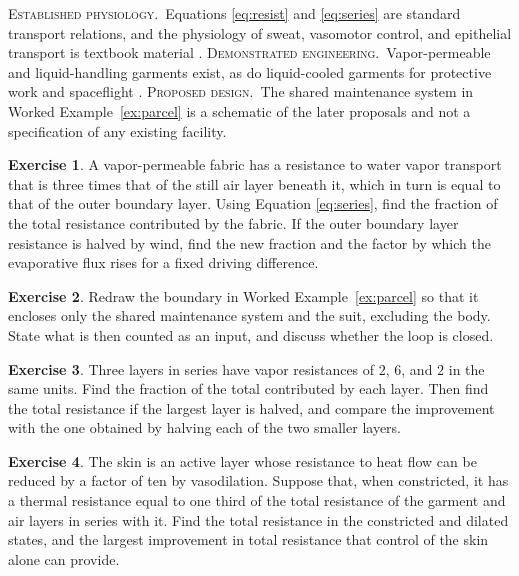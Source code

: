 \documentclass[11pt,openany]{book}
\theoremstyle{definition}
\newtheorem{exercise}{Exercise}[chapter]
\theoremstyle{remark}
\newcommand{\est}{\textsc{Established physiology.}\ }
\newcommand{\dem}{\textsc{Demonstrated engineering.}\ }
\newcommand{\pro}{\textsc{Proposed design.}\ }
\begin{document}
\begin{evidence}
\est Equations \eqref{eq:resist} and \eqref{eq:series} are standard transport relations, and the physiology of sweat, vasomotor control, and epithelial transport is textbook material \cite{bsl2007,guyton2021}. \dem Vapor-permeable and liquid-handling garments exist, as do liquid-cooled garments for protective work and spaceflight \cite{eckart1996}. \pro The shared maintenance system in Worked Example~\ref{ex:parcel} is a schematic of the later proposals and not a specification of any existing facility.
\end{evidence}

\begin{exercise}
A vapor-permeable fabric has a resistance to water vapor transport that is three times that of the still air layer beneath it, which in turn is equal to that of the outer boundary layer. Using Equation \eqref{eq:series}, find the fraction of the total resistance contributed by the fabric. If the outer boundary layer resistance is halved by wind, find the new fraction and the factor by which the evaporative flux rises for a fixed driving difference.
\end{exercise}

\begin{exercise}
Redraw the boundary in Worked Example~\ref{ex:parcel} so that it encloses only the shared maintenance system and the suit, excluding the body. State what is then counted as an input, and discuss whether the loop is closed.
\end{exercise}

\begin{exercise}
Three layers in series have vapor resistances of $2$, $6$, and $2$ in the same units. Find the fraction of the total contributed by each layer. Then find the total resistance if the largest layer is halved, and compare the improvement with the one obtained by halving each of the two smaller layers.
\end{exercise}

\begin{exercise}
The skin is an active layer whose resistance to heat flow can be reduced by a factor of ten by vasodilation. Suppose that, when constricted, it has a thermal resistance equal to one third of the total resistance of the garment and air layers in series with it. Find the total resistance in the constricted and dilated states, and the largest improvement in total resistance that control of the skin alone can provide.
\end{exercise}
\end{document}

